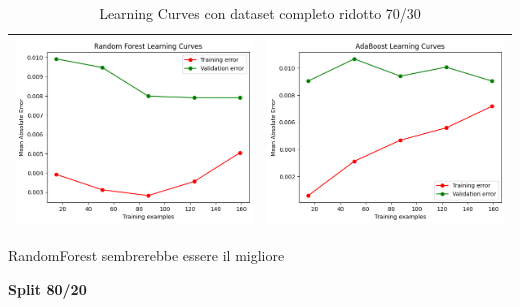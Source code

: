 \begin{table}[H]
\begin{tabularx}{\textwidth}{|X|X|}
        \includegraphics[width=\linewidth, trim=0 0 0 0]{images/RandomForest_lc70_ridotto.png} &
        \includegraphics[width=\linewidth, trim=0 0 0 0]{images/AdaBoost_lc70_ridotto.png} \\
        \hline
    \end{tabularx}
    \caption{Learning Curves con dataset completo ridotto 70/30}
    \label{tab:emissions_info}
\end{table}

\noindent RandomForest sembrerebbe essere il migliore


\noindent\textbf{Split 80/20}


